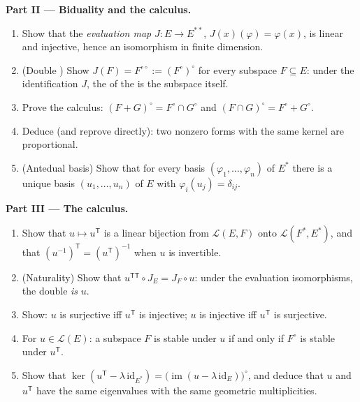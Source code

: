 \begin{problem}
\medskip
\noindent\textbf{Part II --- Biduality and the 
calculus.}
\begin{enumerate}[resume]
  \item Show that the \emph{evaluation map} $J \colon E \to
        E^{**}$, $J(x)(\varphi) = \varphi(x)$, is linear and
        injective, hence an isomorphism in finite dimension.
  \item (Double ) Show $J(F) = F^{\circ\circ} :=
        (F^\circ)^\circ$ for every subspace $F \subseteq E$: under
        the identification $J$, the  of the 
        is the subspace itself.
  \item Prove the  calculus: $(F + G)^\circ = F^\circ
        \cap G^\circ$ and $(F \cap G)^\circ = F^\circ + G^\circ$.
  \item Deduce (and reprove directly): two nonzero forms with the
        same kernel are proportional.
  \item (Antedual basis) Show that for every basis $(\varphi_1,
        \dots, \varphi_n)$ of $E^*$ there is a unique basis
        $(u_1, \dots, u_n)$ of $E$ with $\varphi_i(u_j) =
        \delta_{ij}$.
\end{enumerate}

\medskip
\noindent\textbf{Part III --- The  calculus.}
\begin{enumerate}[resume]
  \item Show that $u \mapsto u^{\mathsf T}$ is a linear bijection
        from $\mathcal{L}(E, F)$ onto $\mathcal{L}(F^*, E^*)$,
        and that $(u^{-1})^{\mathsf T} = (u^{\mathsf T})^{-1}$
        when $u$ is invertible.
  \item (Naturality) Show that $u^{\mathsf T\mathsf T} \circ J_E
        = J_F \circ u$: under the evaluation isomorphisms, the
        double  \emph{is} $u$.
  \item Show: $u$ is surjective iff $u^{\mathsf T}$ is injective;
        $u$ is injective iff $u^{\mathsf T}$ is surjective.
  \item For $u \in \mathcal{L}(E)$: a subspace $F$ is stable
        under $u$ if and only if $F^\circ$ is stable under
        $u^{\mathsf T}$.
  \item Show that $\ker(u^{\mathsf T} - \lambda\,
        \mathrm{id}_{E^*}) = \bigl(\operatorname{im}(u - \lambda\,
        \mathrm{id}_E)\bigr)^\circ$, and deduce that $u$ and
        $u^{\mathsf T}$ have the same eigenvalues with the same
        geometric multiplicities.
\end{enumerate}


\end{problem}
